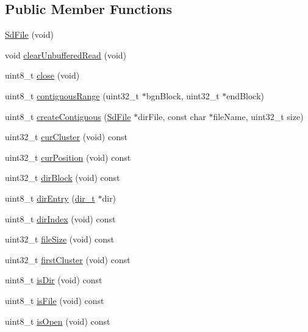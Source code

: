 \subsection*{Public Member Functions}
\begin{DoxyCompactItemize}
\item 
\hyperlink{class_sd_file_a9e08675e64a4ef847700876d4291bbef}{Sd\+File} (void)
\item 
void \hyperlink{class_sd_file_a44c3d6ef602e84b8160a4d215faef7d4}{clear\+Unbuffered\+Read} (void)
\item 
uint8\+\_\+t \hyperlink{class_sd_file_a6b24350c89cc41ff644a343231a3983c}{close} (void)
\item 
uint8\+\_\+t \hyperlink{class_sd_file_a3b07fc09dbcb28ae7c89c060af6a1810}{contiguous\+Range} (uint32\+\_\+t $\ast$bgn\+Block, uint32\+\_\+t $\ast$end\+Block)
\item 
uint8\+\_\+t \hyperlink{class_sd_file_a07fc5c82318f073848e706f95830e5b5}{create\+Contiguous} (\hyperlink{class_sd_file}{Sd\+File} $\ast$dir\+File, const char $\ast$file\+Name, uint32\+\_\+t size)
\item 
uint32\+\_\+t \hyperlink{class_sd_file_ac5edd7e139aac981765b873da7b14c3d}{cur\+Cluster} (void) const 
\item 
uint32\+\_\+t \hyperlink{class_sd_file_a0fa8cd085c7059ced8d5f7855756ede2}{cur\+Position} (void) const 
\item 
uint32\+\_\+t \hyperlink{class_sd_file_a9cb63c516e40ff8aaca0ae23978bb95e}{dir\+Block} (void) const 
\item 
uint8\+\_\+t \hyperlink{class_sd_file_abaf9b1dc12d53cdeb937065edf68927d}{dir\+Entry} (\hyperlink{_fat_structs_8h_a803db59d4e16a0c54a647afc6a7954e3}{dir\+\_\+t} $\ast$dir)
\item 
uint8\+\_\+t \hyperlink{class_sd_file_a050c244681bb8d851e1e17bc3b387dca}{dir\+Index} (void) const 
\item 
uint32\+\_\+t \hyperlink{class_sd_file_ae9409305f9c2adb3650ab7b24093bfa1}{file\+Size} (void) const 
\item 
uint32\+\_\+t \hyperlink{class_sd_file_a593b7df10cf7a8d6a1fa2b6c12e130ac}{first\+Cluster} (void) const 
\item 
uint8\+\_\+t \hyperlink{class_sd_file_a8c656da3a6984395a70bee7932a2a933}{is\+Dir} (void) const 
\item 
uint8\+\_\+t \hyperlink{class_sd_file_a413b50bca08dd037756ae064e30f784c}{is\+File} (void) const 
\item 
uint8\+\_\+t \hyperlink{class_sd_file_a385a138ffead941e46a95b07d6327475}{is\+Open} (void) const 

\end{DoxyCompactItemize}
